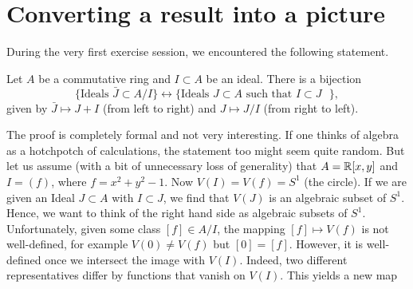 \documentclass[a4paper,11pt]{article}
\begin{document}
\section{Converting a result into a picture}
During the very first exercise session, we encountered the following statement.
\begin{lema}
    Let $A$ be a commutative ring and $I \subset A$ be an ideal. There is a
    bijection 
    $$\{\text{Ideals $\bar J \subset A/I$}\} \leftrightarrow \{\text{Ideals 
    $J \subset A$ such that $I \subset J$ }\},$$
    given by $\bar J \mapsto J + I$ (from left to right) and $J \mapsto J/I$ (from 
    right to left).
\end{lema}
The proof is completely formal and not very interesting. If one thinks of algebra
as a hotchpotch of calculations, the statement too might seem quite random. But 
let us assume (with a bit of unnecessary loss of generality) that $A = \mathbb{R}[x,y]$
and $I = (f)$, where $f = x^2 + y^2 -1$. Now $V(I) = V(f) = S^1$ (the circle).
If we are given an Ideal $J \subset A$ with $I \subset J$, we find that 
$V(J)$ is an algebraic subset of $S^1$. Hence, we want to think of the right hand
side as algebraic subsets of $S^1$. 
Unfortunately, given some class $[f] \in A/I$, the mapping $[f] \mapsto V(f)$ is 
not well-defined, for example $V(0) \neq V(f)$ but $[0] = [f]$. However, it is
well-defined once we intersect the image with $V(I)$. Indeed, two different 
representatives differ by functions that vanish on $V(I)$. This yields a new
map
\end{document}
